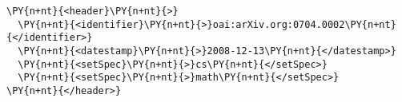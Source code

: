 \begin{Verbatim}[commandchars=\\\{\}, fontsize=\footnotesize, frame=single]
\PY{n+nt}{<header}\PY{n+nt}{>}
  \PY{n+nt}{<identifier}\PY{n+nt}{>}oai:arXiv.org:0704.0002\PY{n+nt}{</identifier>}
  \PY{n+nt}{<datestamp}\PY{n+nt}{>}2008-12-13\PY{n+nt}{</datestamp>}
  \PY{n+nt}{<setSpec}\PY{n+nt}{>}cs\PY{n+nt}{</setSpec>}
  \PY{n+nt}{<setSpec}\PY{n+nt}{>}math\PY{n+nt}{</setSpec>}
\PY{n+nt}{</header>}
\end{Verbatim}
